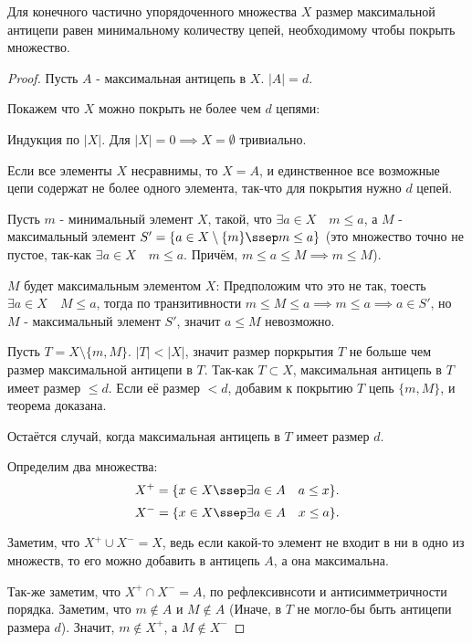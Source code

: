 \begin{theorem} \thmslashn

   Для конечного частично упорядоченного множества $X$ размер максимальной антицепи равен минимальному количеству цепей, необходимому чтобы покрыть множество.

    \begin{proof} \thmslashn
    
        Пусть $A$ - максимальная антицепь в $X$. $|A| = d$.

        Покажем что $X$ можно покрыть не более чем $d$ цепями:
        
        Индукция по $|X|$. Для $|X| = 0 \implies X=\emptyset$ тривиально.

        Если все элементы $X$ несравнимы, то $X = A$, и единственное все возможные цепи содержат не более одного элемента, так-что для покрытия нужно $d$ цепей.

        Пусть $m$ - минимальный элемент $X$, такой, что $\exists{a\in X}\quad m \le a$, а $M$ - максимальный элемент  $S' = \{a\in X \setminus \{m\} \ssep m \le a \} $ (это множество точно не пустое, так-как $\exists{a\in X}\quad m \le  a$. Причём, $m \le a \le M \implies m \le M$). 

        $M$ будет максимальным элементом $X$: Предположим что это не так, тоесть $\exists{a\in X}\quad M \le a$, тогда по транзитивности $m \le M \le a \implies m \le a \implies a\in S'$, но $M$ - максимальный элемент  $S'$, значит  $a \le M$ невозможно.

        Пусть $T = X \setminus \{m, M\} $. $|T| < |X|$, значит размер поркрытия $T$ не больше чем размер максимальной антицепи в $T$. Так-как $T \subset X$, максимальная антицепь в $T$ имеет размер $\le d$. Если её размер $< d$, добавим к покрытию $T$ цепь $\{m, M\} $, и теорема доказана.

        Остаётся случай, когда максимальная антицепь в $T$ имеет размер $d$.

        Определим два множества:
        \[ X^{+} = \{x\in X \ssep \exists{a\in A}\quad a \le x\} .\]
        \[ X^{-} = \{x\in X \ssep \exists{a\in A}\quad x \le a\}  .\]

        Заметим, что $X^{+} \cup X^{-} = X$, ведь если какой-то элемент не входит в ни в одно из множеств, то его можно добавить в антицепь $A$, а она максимальна.

        Так-же заметим, что $X^{+}\cap X^{-} = A$, по рефлексивнсоти и антисимметричности порядка. Заметим, что $m \not\in A$ и $M \not\in A$ (Иначе, в $T$ не могло-бы быть антицепи размера $d$). Значит, $m \not\in X^{+}$, а $M \not\in X^{-}$ 


\end{proof}
\end{theorem}
